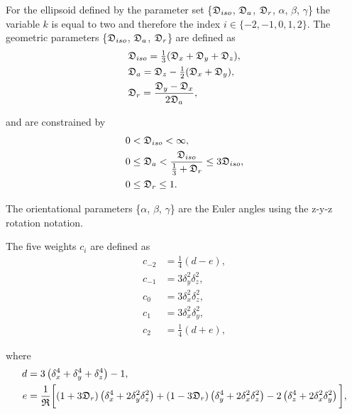 \begin{htmlonly}
\begin{htmlonly}
For the ellipsoid defined by the parameter set \{$\mathfrak{D}_{iso}$, $\mathfrak{D}_a$, $\mathfrak{D}_r$, $\alpha$, $\beta$, $\gamma$\} the variable $k$ is equal to two and therefore the index $i \in \{-2, -1, 0, 1, 2\}$.  The geometric parameters \{$\mathfrak{D}_{iso}$, $\mathfrak{D}_a$, $\mathfrak{D}_r$\} are defined as
\begin{subequations}
\begin{align}
    & \mathfrak{D}_{iso} = \tfrac{1}{3} (\mathfrak{D}_x + \mathfrak{D}_y + \mathfrak{D}_z ),   \label{eq: Diso ellipsoid def} \\
    & \mathfrak{D}_a = \mathfrak{D}_z - \tfrac{1}{2}(\mathfrak{D}_x + \mathfrak{D}_y),         \label{eq: Da ellipsoid def} \\
    & \mathfrak{D}_r = \frac{\mathfrak{D}_y - \mathfrak{D}_x}{2\mathfrak{D}_a},                \label{eq: Dr ellipsoid def}
\end{align}
\end{subequations}

\noindent and are constrained by
\begin{subequations}
\begin{align}
    0 & < \mathfrak{D}_{iso} < \infty,                                                    \label{eq: Diso lim} \\
    0 & \le \mathfrak{D}_a < \frac{\mathfrak{D}_{iso}}{\tfrac{1}{3} + \mathfrak{D}_r} \le 3\mathfrak{D}_{iso}, \label{eq: Da lim} \\
    0 & \le \mathfrak{D}_r \le 1.                                                         \label{eq: Dr lim}
\end{align}
\end{subequations}

\noindent The orientational parameters \{$\alpha$, $\beta$, $\gamma$\} are the Euler angles using the z-y-z rotation notation.


The five weights $c_i$ are defined as
\begin{subequations}
\begin{align}
    c_{-2} &= \tfrac{1}{4}(d - e),     \label{eq: ellipsoid c-2} \\
    c_{-1} &= 3\delta_y^2\delta_z^2,   \label{eq: ellipsoid c-1} \\
    c_{0}  &= 3\delta_x^2\delta_z^2,   \label{eq: ellipsoid c0} \\
    c_{1}  &= 3\delta_x^2\delta_y^2,   \label{eq: ellipsoid c1} \\
    c_{2}  &= \tfrac{1}{4}(d + e),     \label{eq: ellipsoid c2}
\end{align}
\end{subequations}

\noindent where
\begin{align}
    d &= 3 \left( \delta_x^4 + \delta_y^4 + \delta_z^4 \right) - 1, \label{eq: ellipsoid d} \\
    e &= \frac{1}{\mathfrak{R}} \bigg[ (1 + 3\mathfrak{D}_r) \left(\delta_x^4 + 2\delta_y^2\delta_z^2\right)
        + (1 - 3\mathfrak{D}_r) \left(\delta_y^4 + 2\delta_x^2\delta_z^2\right) - 2 \left(\delta_z^4 + 2\delta_x^2\delta_y^2\right) \bigg], \label{eq: ellipsoid e}
\end{align}


\end{htmlonly}
\end{htmlonly}
